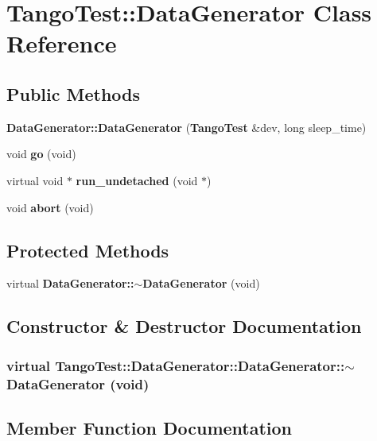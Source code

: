 \section{Tango\-Test::Data\-Generator  Class Reference}
\label{classTangoTest_1_1DataGenerator}
\subsection*{Public Methods}
\begin{CompactItemize}
\item 
{\bf Data\-Generator::Data\-Generator} ({\bf Tango\-Test} \&dev, long sleep\_\-time)
\item 
void {\bf go} (void)
\item 
virtual void $\ast$ {\bf run\_\-undetached} (void $\ast$)
\item 
void {\bf abort} (void)
\end{CompactItemize}
\subsection*{Protected Methods}
\begin{CompactItemize}
\item 
virtual {\bf Data\-Generator::$\sim$Data\-Generator} (void)
\end{CompactItemize}


\subsection{Constructor \& Destructor Documentation}
\subsubsection{\setlength{\rightskip}{0pt plus 5cm}virtual Tango\-Test::Data\-Generator::Data\-Generator::$\sim$Data\-Generator (void)\hspace{0.3cm}{\tt  [inline, protected, virtual]}}\label{classTangoTest_1_1DataGenerator_b0}




\subsection{Member Function Documentation}
